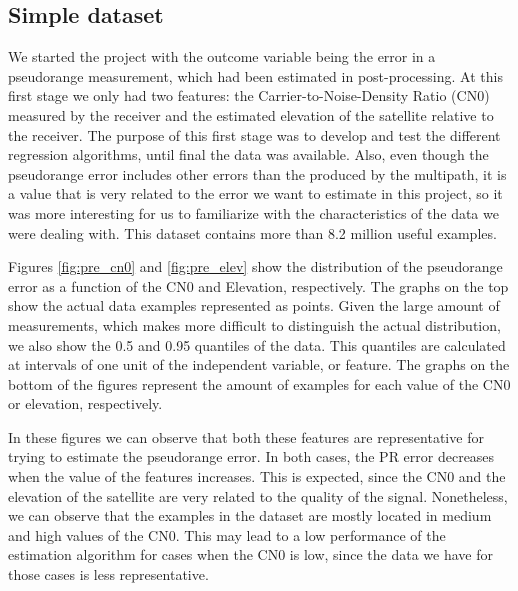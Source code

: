 \documentclass[a4paper, report, oneside, UKenglish]{memoir}
\begin{document}
\subsection{Simple dataset}
We started the project with the outcome variable being the error in a pseudorange measurement, which had been estimated in post-processing. At this first stage we only had two features: the Carrier-to-Noise-Density Ratio (CN0) measured by the receiver and the estimated elevation of the satellite relative to the receiver. The purpose of this first stage was to develop and test the different regression algorithms, until final the data was available. Also, even though the pseudorange error includes other errors than the produced by the multipath, it is a value that is very related to the error we want to estimate in this project, so it was more interesting for us to familiarize with the characteristics of the data we were dealing with. This dataset contains more than 8.2 million useful examples.

Figures \ref{fig:pre_cn0} and \ref{fig:pre_elev} show the distribution of the pseudorange error as a function of the CN0 and Elevation, respectively. The graphs on the top show the actual data examples represented as points. Given the large amount of measurements, which makes more difficult to distinguish the actual distribution, we also show the 0.5 and 0.95 quantiles of the data. This quantiles are calculated at intervals of one unit of the independent variable, or feature. The graphs on the bottom of the figures represent the amount of examples for each value of the CN0 or elevation, respectively.

In these figures we can observe that both these features are representative for trying to estimate the pseudorange error. In both cases, the PR error decreases when the value of the features increases. This is expected, since the CN0 and the elevation of the satellite are very related to the quality of the signal. Nonetheless, we can observe that the examples in the dataset are mostly located in medium and high values of the CN0. This may lead to a low performance of the estimation algorithm for cases when the CN0 is low, since the data we have for those cases is less representative.
\end{document}
